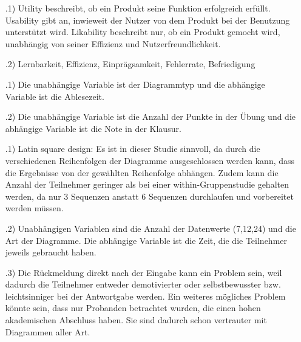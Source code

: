 \documentclass[12pt]{scrartcl}
\begin{document}
\exercise{}
    \begin{itemize}
        \item[\theenumi.1)]
            Utility beschreibt, ob ein Produkt seine Funktion erfolgreich erfüllt.
            Usability gibt an, inwieweit der Nutzer von dem Produkt bei der Benutzung unterstützt wird.
            Likability beschreibt nur, ob ein Produkt gemocht wird, unabhängig von seiner Effizienz und Nutzerfreundlichkeit.
        \item[\theenumi.2)]Lernbarkeit, Effizienz, Einprägsamkeit, Fehlerrate, Befriedigung 
    \end{itemize}
\newpage

\setcounter{enumi}{4}
\exercise{}
\begin{itemize}
    \item[\theenumi.1)] Die unabhängige Variable ist der Diagrammtyp und die abhängige Variable ist die Ablesezeit.
    \item[\theenumi.2)] Die unabhängige Variable ist die Anzahl der Punkte in der Übung und die abhängige Variable ist die Note in der Klausur.
\end{itemize}
\newpage

\exercise{}
\begin{itemize}
    \item[\theenumi.1)] Latin square design: Es ist in dieser Studie sinnvoll, da durch die verschiedenen Reihenfolgen der Diagramme 
                        ausgeschlossen werden kann, dass die Ergebnisse von der gewählten Reihenfolge abhängen. Zudem kann die Anzahl der Teilnehmer geringer als bei einer within-Gruppenstudie gehalten werden, 
                        da nur 3 Sequenzen anstatt 6 Sequenzen durchlaufen und vorbereitet werden müssen.
	\item[\theenumi.2)] Unabhängigen Variablen sind die Anzahl der Datenwerte (7,12,24) und die Art der Diagramme. Die abhängige Variable ist die Zeit, die die Teilnehmer jeweils gebraucht haben.
	\item[\theenumi.3)] Die Rückmeldung direkt nach der Eingabe kann ein Problem sein, weil dadurch die Teilnehmer entweder demotivierter oder selbstbewusster bzw. leichtsinniger bei der Antwortgabe werden.
	Ein weiteres mögliches Problem könnte sein, dass nur Probanden betrachtet wurden, die einen hohen akademischen Abschluss haben. Sie sind dadurch schon vertrauter mit Diagrammen aller Art.
\end{itemize}
\newpage
\end{document}
